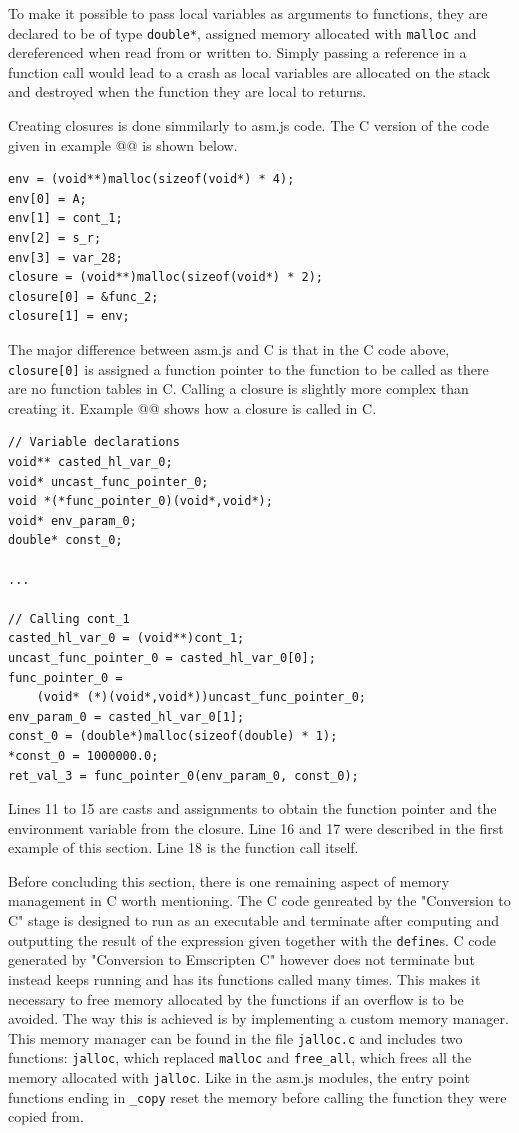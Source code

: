 \documentclass[11pt]{report}
\begin{document}
To make it possible to pass local variables as arguments to functions, they are declared to be of type \texttt{double*}, assigned memory allocated with \texttt{malloc} and dereferenced when read from or written to. Simply passing a reference in a function call would lead to a crash as local variables are allocated on the stack and destroyed when the function they are local to returns.

Creating closures is done simmilarly to asm.js code. The C version of the code given in example @@ is shown below.

\begin{lstlisting}
env = (void**)malloc(sizeof(void*) * 4);
env[0] = A;
env[1] = cont_1;
env[2] = s_r;
env[3] = var_28;
closure = (void**)malloc(sizeof(void*) * 2);
closure[0] = &func_2;
closure[1] = env;
\end{lstlisting}

The major difference between asm.js and C is that in the C code above, \texttt{closure[0]} is assigned a function pointer to the function to be called as there are no function tables in C. Calling a closure is slightly more complex than creating it. Example @@ shows how a closure is called in C.

\begin{lstlisting}
// Variable declarations
void** casted_hl_var_0;
void* uncast_func_pointer_0;
void *(*func_pointer_0)(void*,void*);
void* env_param_0;
double* const_0;

...

// Calling cont_1
casted_hl_var_0 = (void**)cont_1;
uncast_func_pointer_0 = casted_hl_var_0[0];
func_pointer_0 = 
    (void* (*)(void*,void*))uncast_func_pointer_0;
env_param_0 = casted_hl_var_0[1];
const_0 = (double*)malloc(sizeof(double) * 1);
*const_0 = 1000000.0;
ret_val_3 = func_pointer_0(env_param_0, const_0);
\end{lstlisting}

Lines 11 to 15 are casts and assignments to obtain the function pointer and the environment variable from the closure. Line 16 and 17 were described in the first example of this section. Line 18 is the function call itself.

Before concluding this section, there is one remaining aspect of memory management in C worth mentioning. The C code genreated by the "Conversion to C" stage is designed to run as an executable and terminate after computing and outputting the result of the expression given together with the \texttt{define}s. C code generated by "Conversion to Emscripten C" however does not terminate but instead keeps running and has its functions called many times. This makes it necessary to free memory allocated by the functions if an overflow is to be avoided. The way this is achieved is by implementing a custom memory manager. This memory manager can be found in the file \texttt{jalloc.c} and includes two functions: \texttt{jalloc}, which replaced \texttt{malloc} and \texttt{free_all}, which frees all the memory allocated with \texttt{jalloc}. Like in the asm.js modules, the entry point functions ending in \texttt{_copy} reset the memory before calling the function they were copied from.
\end{document}
